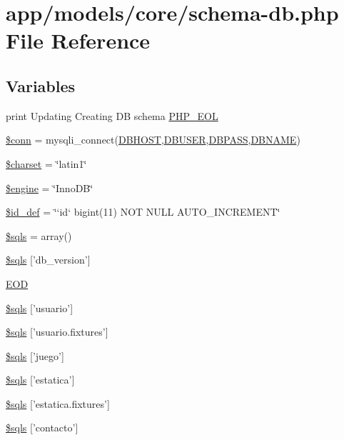 \hypertarget{schema-db_8php}{\section{app/models/core/schema-\/db.php File Reference}
\label{schema-db_8php}
}
\subsection*{Variables}
\begin{DoxyCompactItemize}
\item 
print Updating Creating D\-B schema \hyperlink{schema-db_8php_af94ea1bae0b857f181d247227c3a6871}{P\-H\-P\-\_\-\-E\-O\-L}
\item 
\hyperlink{schema-db_8php_aa8a5a87b9c1a6a0819b88447cbe41877}{\$conn} = mysqli\-\_\-connect(\hyperlink{dbconfig__sample_8php_a40edb9274f7711736cc3ee12d2e5ddba}{D\-B\-H\-O\-S\-T},\hyperlink{dbconfig__sample_8php_a221f39b0b526c043e3a1ade2dd56a70e}{D\-B\-U\-S\-E\-R},\hyperlink{dbconfig__sample_8php_add7bef9fbed1ad1fa386dcb65fd5d813}{D\-B\-P\-A\-S\-S},\hyperlink{dbconfig__sample_8php_af7d219badcc93cc3a13a604c769542bc}{D\-B\-N\-A\-M\-E})
\item 
\hyperlink{schema-db_8php_af10158dd74b75f1d337e83102d6b82ce}{\$charset} = \char`\"{}latin1\char`\"{}
\item 
\hyperlink{schema-db_8php_a8a3b012ad4844366d9207d8f0e174a00}{\$engine} = \char`\"{}Inno\-D\-B\char`\"{}
\item 
\hyperlink{schema-db_8php_acafba87ce83b03b84b50986f6b889af9}{\$id\-\_\-def} = \char`\"{}`id` bigint(11) N\-O\-T N\-U\-L\-L A\-U\-T\-O\-\_\-\-I\-N\-C\-R\-E\-M\-E\-N\-T\char`\"{}
\item 
\hyperlink{schema-db_8php_a4df5cfe5ef69919928b0b8eefb5b37bb}{\$sqls} = array()
\item 
\hyperlink{schema-db_8php_a4a6860ececc2f779397c3be91a511f04}{\$sqls} \mbox{[}'db\-\_\-version'\mbox{]}
\item 
\hyperlink{schema-db_8php_ac8a03077e71541ffe293d8340207465f}{E\-O\-D}
\item 
\hyperlink{schema-db_8php_a0fcc07ef2f0443f2b41511067727e19a}{\$sqls} \mbox{[}'usuario'\mbox{]}
\item 
\hyperlink{schema-db_8php_aa1f30e1a178cf31fbe7e6fe9a6dd6d27}{\$sqls} \mbox{[}'usuario.\-fixtures'\mbox{]}
\item 
\hyperlink{schema-db_8php_a46ad290dbf5309d00cdcb48a94b82462}{\$sqls} \mbox{[}'juego'\mbox{]}
\item 
\hyperlink{schema-db_8php_a70443004bdb9b59c8da0737364dbcde7}{\$sqls} \mbox{[}'estatica'\mbox{]}
\item 
\hyperlink{schema-db_8php_af4499fcdc0a562916d4f71c03e8e0e57}{\$sqls} \mbox{[}'estatica.\-fixtures'\mbox{]}
\item 
\hyperlink{schema-db_8php_a1c0e5cff264dd24282baf058999dcbf3}{\$sqls} \mbox{[}'contacto'\mbox{]}
\end{DoxyCompactItemize}


